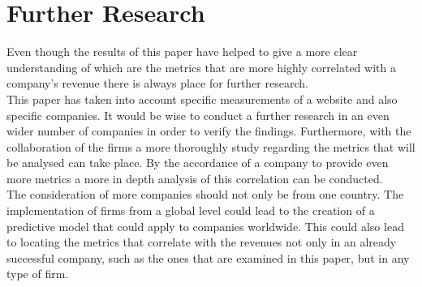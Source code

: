 \documentclass{book}
\begin{document}
\chapter{Further Research}
Even though the results of this paper have helped to give a more clear understanding of which are the metrics that are more highly correlated with a company's revenue there is always place for further research.\\
This paper has taken into account specific measurements of a website and also specific companies. It would be wise to conduct a further research in an even wider number of companies in order to verify the findings. Furthermore, with the collaboration of the firms a more thoroughly study regarding the metrics that will be analysed can take place. By the accordance of a company to provide even more metrics a more in depth analysis of this correlation can be conducted.\\
The consideration of more companies should not only be from one country. The implementation of firms from a global level could lead to the creation of a predictive model that could apply to companies worldwide. This could also lead to locating the metrics that correlate with the revenues not only in an already successful company, such as the ones that are examined in this paper, but in any type of firm.\\


\pagebreak  
\end{document}
